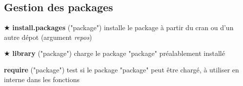 \documentclass[11, a4paper, landscape]{article}
\newif\ifadvanced
\newcommand{\grasindex}[1]{\textbf{#1} \index{#1\textbf}}
\newcommand{\bu}[0]{\ifadvanced \else \hspace*{-1mm}$\bigstar$ \hspace*{0.15mm}\fi}
\newcommand{\adv}[1]{\ifadvanced #1 \fi}
\begin{document}
\begin{multicols*}{3}
\subsection{Gestion des packages}

\bu\grasindex{install.packages}("package") \quad installe le package à partir du cran ou d'un autre dépot (argument \textit{repos})

\bu\grasindex{library}("package") \quad  charge le package "package" préalablement installé

\grasindex{require}("package") \quad  test si le package "package" peut être chargé, à utiliser en interne dans les fonctions

\adv{
  \grasindex{update.packages}("package") \quad  met à jour les packages installés

  \grasindex{remove.packages}("package") \quad  supprime les packages installés

  \grasindex{installed.packages}("package") \quad  liste les packages installés

  \grasindex{updateR}(F, T, T, F, T, F, T) \quad nécessite le package \texttt{installr}, permet une mise à jour de R en gardant les packages de l'ancienne version de R. \href{http://www.r-statistics.com/2013/03/updating-r-from-r-on-windows-using-the-installr-package/} {Plus d'infos}.

  \grasindex{revdep\_check}() \quad possible de résumer avec \grasindex{revdep\_check\_summary}.

  nompackage\grasindex{::}nomfunction \quad Appelle la fonction nomfunction du package nompackage. En particulier utile pour les fonctions cachées (\textit{e.g.} \textsc{plot.data.frame} du package \textsc{stats}). nompackage\grasindex{:::}nomfunction va chercher aussi les fonctions cachés du package (celle qui ne sont pas exportée dans le \textsc{namespace})
}

\adv{
  \subsection{ade4}

  \grasindex{table.value}(a) \quad  représentation graphique des valeurs de la matrice (très utile pour visualiser une matrice de distance)

  \grasindex{s.value}()

  \grasindex{dist.binary}(a)  \quad indice de similarité (\textit{e.g.} Jaccard). Attention, pour jaccard l'indice n'est pas le même que celui calculé avec vegdist (calcul strict dans vegan, on retrouve la même chose qu'à la main) à cause d'une transformation. Cependant les deux similarités sont strictement proportionnelles (relation non linéaire).

}
\end{multicols*}
\end{document}
